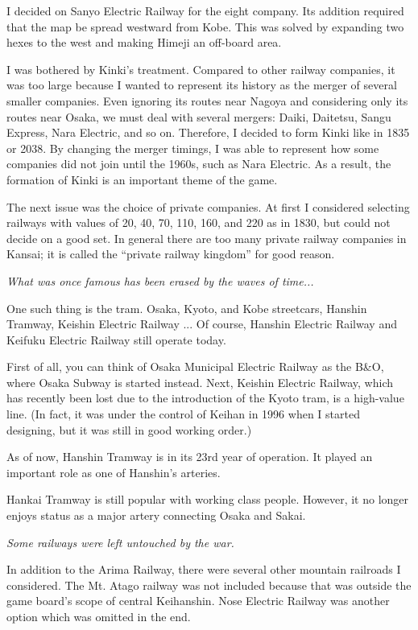 \begin{multicols}{2}
I decided on Sanyo Electric Railway for the eight company. Its
addition required that the map be spread westward from Kobe. This was
solved by expanding two hexes to the west and making Himeji an
off-board area.

I was bothered by Kinki's treatment. Compared to other railway
companies, it was too large because I wanted to represent its history
as the merger of several smaller companies. Even ignoring its routes
near Nagoya and considering only its routes near Osaka, we must deal
with several mergers: Daiki, Daitetsu, Sangu Express, Nara Electric,
and so on. Therefore, I decided to form Kinki like in 1835 or 2038. By
changing the merger timings, I was able to represent how some
companies did not join until the 1960s, such as Nara Electric. As a
result, the formation of Kinki is an important theme of the game.

The next issue was the choice of private companies. At first I
considered selecting railways with values of 20, 40, 70, 110, 160, and
220 as in 1830, but could not decide on a good set. In general there
are too many private railway companies in Kansai; it is called the
``private railway kingdom'' for good reason.

\emph{What was once famous has been erased by the waves of time...}


One such thing is the tram. Osaka, Kyoto, and Kobe streetcars, Hanshin
Tramway, Keishin Electric Railway ... Of course, Hanshin Electric
Railway and Keifuku Electric Railway still operate today.

First of all, you can think of Osaka Municipal Electric Railway as the
B\&O, where Osaka Subway is started instead. Next, Keishin Electric
Railway, which has recently been lost due to the introduction of the
Kyoto tram, is a high-value line. (In fact, it was under the control
of Keihan in 1996 when I started designing, but it was still in good
working order.)

As of now, Hanshin Tramway is in its 23rd year of operation. It played
an important role as one of Hanshin's arteries.

Hankai Tramway is still popular with working class people. However, it
no longer enjoys status as a major artery connecting Osaka and Sakai.

\emph{Some railways were left untouched by the war.}

In addition to the Arima Railway, there were several other mountain
railroads I considered. The Mt. Atago railway was not included because
that was outside the game board's scope of central Keihanshin. Nose
Electric Railway was another option which was omitted in the end.


\end{multicols}
